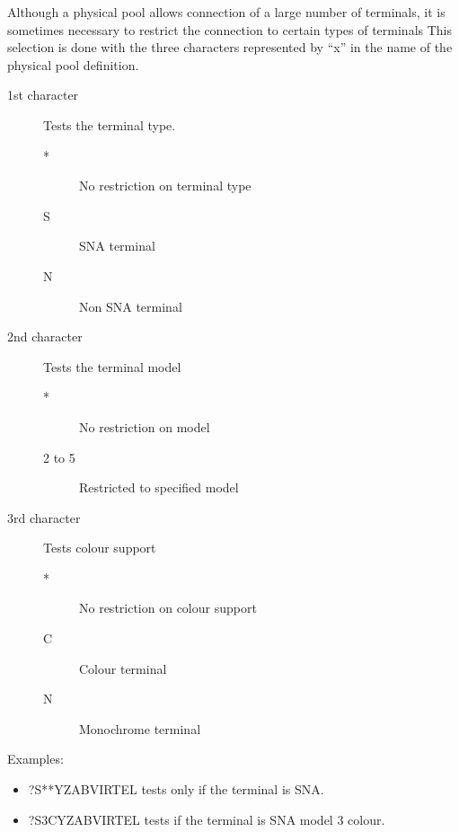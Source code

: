\documentclass[letterpaper,10pt,english]{sphinxmanual}
\begin{document}
Although a physical pool allows connection of a large number of terminals, it is sometimes necessary to restrict the connection to certain types of terminals This selection is done with the three characters represented by “x” in the name of the physical pool definition.
\begin{description}
\item[{1st character}] \leavevmode
Tests the terminal type.
\begin{description}
\item[{*}] \leavevmode
No restriction on terminal type

\item[{S}] \leavevmode
SNA terminal

\item[{N}] \leavevmode
Non SNA terminal

\end{description}

\item[{2nd character}] \leavevmode
Tests the terminal model
\begin{description}
\item[{*}] \leavevmode
No restriction on model

\item[{2 to 5}] \leavevmode
Restricted to specified model

\end{description}

\item[{3rd character}] \leavevmode
Tests colour support
\begin{description}
\item[{*}] \leavevmode
No restriction on colour support

\item[{C}] \leavevmode
Colour terminal

\item[{N}] \leavevmode
Monochrome terminal

\end{description}

\end{description}

Examples:
\begin{itemize}
\item {} 
?S**YZABVIRTEL tests only if the terminal is SNA.

\item {} 
?S3CYZABVIRTEL tests if the terminal is SNA model 3 colour.

\end{itemize}
\end{document}
